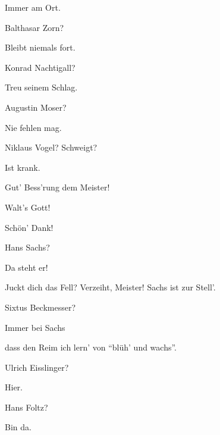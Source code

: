 \begin{drama}
\Ortelspeaks
Immer am Ort.



\Kothnerspeaks
Balthasar Zorn?

\Zornspeaks
Bleibt niemals fort.



\Kothnerspeaks
Konrad Nachtigall?

\Nachtigallspeaks
Treu seinem Schlag.



\Kothnerspeaks
Augustin Moser?

\Moserspeaks
Nie fehlen mag.



\Kothnerspeaks
Niklaus Vogel? Schweigt?



Ist krank.

\Kothnerspeaks
Gut' Bess'rung dem Meister!


Walt's Gott!

Schön' Dank!



\Kothnerspeaks
Hans Sachs?

\Davidspeaks
{}

Da steht er!

\Sachsspeaks
{}

Juckt dich das Fell?
Verzeiht, Meister! Sachs ist zur Stell'.



\Kothnerspeaks
Sixtus Beckmesser?

\Beckmesserspeaks
Immer bei Sachs


dass den Reim ich lern' von ``blüh' und wachs''.




\Kothnerspeaks
Ulrich Eisslinger?

\Eisslingerspeaks
Hier.



\Kothnerspeaks
Hans Foltz?

\Foltzspeaks
Bin da.


\end{drama}
